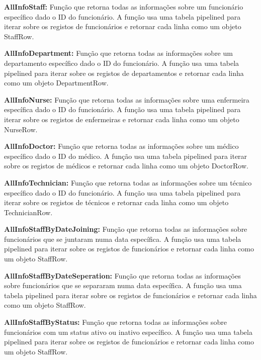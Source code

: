 \vspace{0.15cm}
\textbf{AllInfoStaff:} Função que retorna todas as informações sobre um funcionário específico dado o ID do funcionário. A função usa uma tabela pipelined para iterar sobre os registos de funcionários e retornar cada linha como um objeto StaffRow.

\vspace{0.15cm}
\textbf{AllInfoDepartment:} Função que retorna todas as informações sobre um departamento específico dado o ID do funcionário. A função usa uma tabela pipelined para iterar sobre os registos de departamentos e retornar cada linha como um objeto DepartmentRow.

\vspace{0.15cm}
\textbf{AllInfoNurse:} Função que retorna todas as informações sobre uma enfermeira específica dado o ID do funcionário. A função usa uma tabela pipelined para iterar sobre os registos de enfermeiras e retornar cada linha como um objeto NurseRow.

\vspace{0.15cm}
\textbf{AllInfoDoctor:} Função que retorna todas as informações sobre um médico específico dado o ID do médico. A função usa uma tabela pipelined para iterar sobre os registos de médicos e retornar cada linha como um objeto DoctorRow.

\vspace{0.15cm}
\textbf{AllInfoTechnician:} Função que retorna todas as informações sobre um técnico específico dado o ID do funcionário. A função usa uma tabela pipelined para iterar sobre os registos de técnicos e retornar cada linha como um objeto TechnicianRow.

\vspace{0.15cm}
\textbf{AllInfoStaffByDateJoining:} Função que retorna todas as informações sobre funcionários que se juntaram numa data específica. A função usa uma tabela pipelined para iterar sobre os registos de funcionários e retornar cada linha como um objeto StaffRow.

\vspace{0.15cm}
\textbf{AllInfoStaffByDateSeperation:} Função que retorna todas as informações sobre funcionários que se separaram numa data específica. A função usa uma tabela pipelined para iterar sobre os registos de funcionários e retornar cada linha como um objeto StaffRow.

\vspace{0.15cm}
\textbf{AllInfoStaffByStatus:} Função que retorna todas as informações sobre funcionários com um status ativo ou inativo específico. A função usa uma tabela pipelined para iterar sobre os registos de funcionários e retornar cada linha como um objeto StaffRow.

